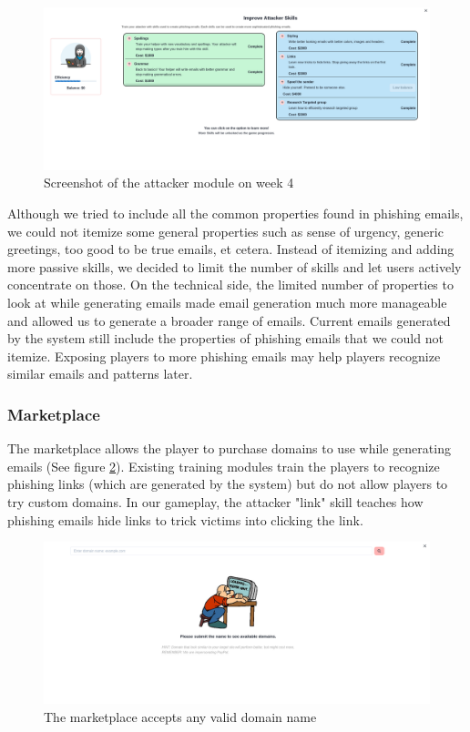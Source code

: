 \begin{figure}[!ht]
    \centering
    \includegraphics[width=\textwidth]{figures/section2/attacker.png}
    \caption{Screenshot of the attacker module on week 4}
    \label{fig:attacker}
\end{figure}

Although we tried to include all the common properties found in phishing emails, we could not itemize some general properties such as sense of urgency, generic greetings, too good to be true emails, et cetera. Instead of itemizing and adding more passive skills, we decided to limit the number of skills and let users actively concentrate on those. On the technical side, the limited number of properties to look at while generating emails made email generation much more manageable and allowed us to generate a broader range of emails. Current emails generated by the system still include the properties of phishing emails that we could not itemize. Exposing players to more phishing emails may help players recognize similar emails and patterns later.

\subsubsection{Marketplace}
The marketplace allows the player to purchase domains to use while generating emails (See figure \ref{fig:marketplace}). Existing training modules train the players to recognize phishing links (which are generated by the system) but do not allow players to try custom domains. In our gameplay, the attacker "link" skill teaches how phishing emails hide links to trick victims into clicking the link.

\begin{figure}[!ht]
    \centering
    \includegraphics[width=1\textwidth]{figures/section2/marketplace_empty.png}
    \caption[Screenshot of marketplace]{The marketplace accepts any valid domain name}
    \label{fig:marketplace}
\end{figure}

